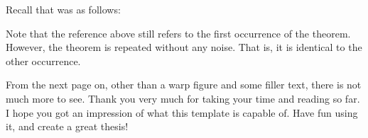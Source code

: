 Recall that  was as follows:

\variableDrift*

Note that the reference above still refers to the first occurrence of the theorem. However, the theorem is repeated without any noise. That is, it is identical to the other occurrence.

From the next page on, other than a warp figure and some filler text, there is not much more to see. Thank you very much for taking your time and reading so far. I hope you got an impression of what this template is capable of. Have fun using it, and create a great thesis!





